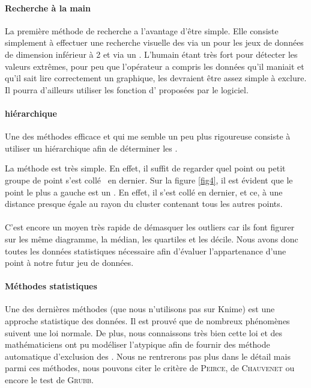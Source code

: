 \paragraph{Recherche \og à la main\fg}
La première méthode de recherche a l'avantage d'être simple. Elle consiste simplement à effectuer une recherche visuelle des  via un  pour les jeux de données de dimension inférieur à 2 et via un . L'humain étant très fort pour détecter les valeurs extrêmes, pour peu que l'opérateur a compris les données qu'il maniait et qu'il sait lire correctement un graphique, les  devraient être assez simple à exclure. Il pourra d'ailleurs utiliser les fonction d' proposées par le logiciel.

\begin{multicols}{2}
	 \columnbreak
\end{multicols}

\paragraph{ hiérarchique}
Une des méthodes efficace et qui me semble un peu plus rigoureuse consiste à utiliser un  hiérarchique afin de déterminer les .

La méthode est très simple. En effet, il suffit de regarder quel point ou petit groupe de point s'est \og collé\fg~ en dernier. Sur la figure \ref{fig4}, il est évident que le point le plus a gauche est un . En effet, il s'est collé en dernier, et ce, à une distance presque égale au rayon du cluster contenant tous les autres points.

\paragraph{}
C'est encore un moyen très rapide de démasquer les outliers car ils font figurer sur les même diagramme, la médian, les quartiles et les décile. Nous avons donc toutes les données statistiques nécessaire afin d'évaluer l'appartenance d'une point à notre futur jeu de données.

\paragraph{Méthodes statistiques}
Une des dernières méthodes (que nous n'utilisons pas sur Knime) est une approche statistique des données. Il est prouvé que de nombreux phénomènes suivent une loi normale. De plus, nous connaissons très bien cette loi et des mathématiciens ont pu modéliser l'atypique afin de fournir des méthode automatique d'exclusion des . Nous ne rentrerons pas plus dans le détail mais parmi ces méthodes, nous pouvons citer le critère de \textsc{Peirce}, de \textsc{Chauvenet} ou encore le test de \textsc{Grubb}.


